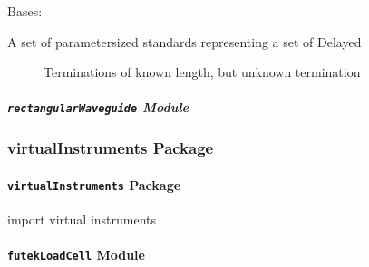 \documentclass[letterpaper,10pt,english]{sphinxmanual}
\begin{document}

\begin{fulllineitems}
\label{api/mwavepy.calibration.parametricStandard:mwavepy.calibration.parametricStandard.parametricStandard.SlidingLoad_UnknownTermination}
Bases: {\hyperref[api/mwavepy.calibration.parametricStandard:mwavepy.calibration.parametricStandard.parametricStandard.ParametricStandard]{}}
\begin{description}
\item[{A set of parametersized standards representing a set of Delayed}] \leavevmode
Terminations of known length, but unknown termination

\end{description}

\end{fulllineitems}



\subparagraph{\texttt{rectangularWaveguide} Module}
\label{api/mwavepy.calibration.parametricStandard:rectangularwaveguide-module}\label{api/mwavepy.calibration.parametricStandard:module-mwavepy.calibration.parametricStandard.rectangularWaveguide}

\subsubsection{virtualInstruments Package}
\label{api/mwavepy.virtualInstruments:virtualinstruments-package}\label{api/mwavepy.virtualInstruments::doc}

\paragraph{\texttt{virtualInstruments} Package}
\label{api/mwavepy.virtualInstruments:id1}\label{api/mwavepy.virtualInstruments:module-mwavepy.virtualInstruments}
import virtual instruments


\paragraph{\texttt{futekLoadCell} Module}
\label{api/mwavepy.virtualInstruments:futekloadcell-module}\label{api/mwavepy.virtualInstruments:module-mwavepy.virtualInstruments.futekLoadCell}
\end{document}

